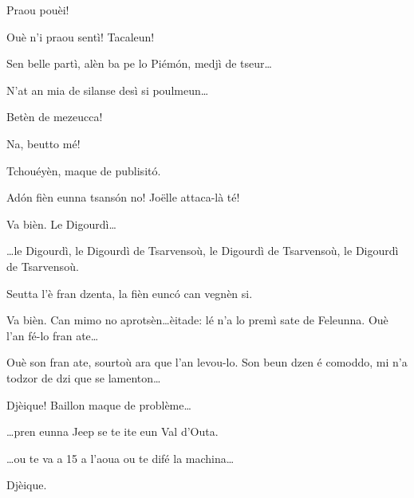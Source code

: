 \begin{drama}

\Jordyspeaks Praou pouèi!

\Chauffeurspeaks Ouè n'i praou sentì! Tacaleun!


\Joelspeaks Sen belle partì, alèn ba pe lo Piém\'on, medjì de tseur\ldots 


\Joelspeaks N'at an mia de silanse desì si poulmeun\ldots

\Thierryspeaks Betèn de mezeucca!


\Chauffeurspeaks Na, beutto mé!


\Chauffeurspeaks Tchouéyèn, maque de publisit\'o.

\Joelspeaks Ad\'on fièn eunna tsans\'on no! Jo\"{e}lle attaca-là té!

\Joellespeaks Va bièn.  Le Digourdì\ldots

\Tcheuttespeaks{} \ldots le Digourdì, le Digourdì de Tsarvensoù, le Digourdì de Tsarvensoù, le Digourdì de Tsarvensoù.

\Joelspeaks Seutta l'è fran dzenta, la fièn euncó can vegnèn si.

\Chauffeurspeaks Va bièn. Can mimo no aprotsèn\ldots èitade: lé n'a lo premì sate de Feleunna. Ouè l'an fé-lo fran ate\ldots


\Joelspeaks Ouè son fran ate, sourtoù ara que l'an levou-lo. Son beun dzen é comoddo, mi n'a todzor de dzi que se lamenton\ldots

\Chauffeurspeaks Djèique! Baillon maque de problème\ldots

\Joelspeaks{} \ldots pren eunna Jeep se te ite eun Val d'Outa.

\Chauffeurspeaks{} \ldots ou te va a 15 a l'aoua ou te difé la machina\ldots

\Joelspeaks Djèique.


\end{drama}
